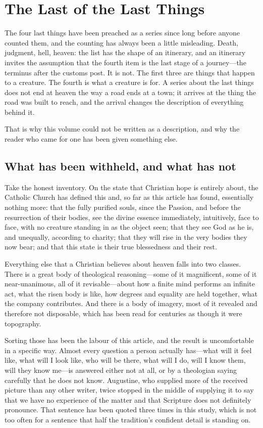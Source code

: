 \section{The Last of the Last Things}

The four last things have been preached as a series since long before anyone counted them, and the counting has always been a little misleading. Death, judgment, hell, heaven: the list has the shape of an itinerary, and an itinerary invites the assumption that the fourth item is the last stage of a journey---the terminus after the customs post. It is not. The first three are things that happen to a creature. The fourth is what a creature is for. A series about the last things does not end at heaven the way a road ends at a town; it arrives at the thing the road was built to reach, and the arrival changes the description of everything behind it.

That is why this volume could not be written as a description, and why the reader who came for one has been given something else.

\subsection{What has been withheld, and what has not}

Take the honest inventory. On the state that Christian hope is entirely about, the Catholic Church has defined this and, so far as this article has found, essentially nothing more: that the fully purified souls, since the Passion, and before the resurrection of their bodies, see the divine essence immediately, intuitively, face to face, with no creature standing in as the object seen; that they see God as he is, and unequally, according to charity; that they will rise in the very bodies they now bear; and that this state is their true blessedness and their rest.

Everything else that a Christian believes about heaven falls into two classes. There is a great body of theological reasoning---some of it magnificent, some of it near-unanimous, all of it revisable---about how a finite mind performs an infinite act, what the risen body is like, how degrees and equality are held together, what the company contributes. And there is a body of imagery, most of it revealed and therefore not disposable, which has been read for centuries as though it were topography.

Sorting those has been the labour of this article, and the result is uncomfortable in a specific way. Almost every question a person actually has---what will it feel like, what will I look like, who will be there, what will I do, will I know them, will they know me---is answered either not at all, or by a theologian saying carefully that he does not know. Augustine, who supplied more of the received picture than any other writer, twice stopped in the middle of supplying it to say that we have no experience of the matter and that Scripture does not definitely pronounce. That sentence has been quoted three times in this study, which is not too often for a sentence that half the tradition's confident detail is standing on.

